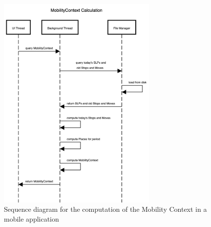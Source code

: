 \begin{figure}
    \centering
    \includegraphics[width=0.7\textwidth]{images/diagrams/sequence.png}
    \caption{Sequence diagram for the computation of the Mobility Context in a mobile application}
    \label{fig:sequence-diagram-mobility-context}
\end{figure}
